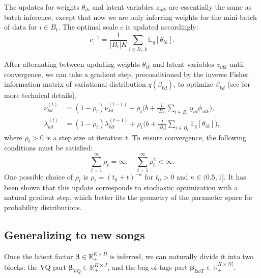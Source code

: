 The updates for weights $\theta_{ik}$ and latent variables $z_{idk}$ are essentially the same as batch inference, except that now we are only inferring weights for the mini-batch of data
for $i \in B_t$. The optimal scale $c$ is updated accordingly:
\begin{equation}
c^{-1} = \frac{1}{|B_t| K}\sum_{i \in B_t, k} \mathbb{E}_q [\theta_{ik}].
\end{equation}

After alternating between updating weights $\theta_{ik}$ and latent variables $z_{idk}$ until convergence, we can take a gradient step,  preconditioned by the inverse Fisher information matrix of variational distribution $q(\beta_{kd})$, to optimize $\beta_{kd}$ (see \cite{hoffman2013stochastic} for more technical details), 
\begin{equation}
\begin{split}
\nu_{kd}^{(t)} &= (1 - \rho_t) \nu_{kd}^{(t-1)} + \rho_t \biggl(b +  \frac{I}{|B_t|}\sum_{i \in B_t} y_{id} \phi_{idk}\biggl),\\
\lambda_{kd}^{(t)} &= (1 - \rho_t) \lambda_{kd}^{(t-1)} + \rho_t \biggl( b +  \frac{I}{|B_t|}\sum_{i \in B_t} \mathbb{E}_q[\theta_{ik}]\biggl),
\end{split}
\end{equation}
where $\rho_t > 0$ is a step size at iteration $t$. To ensure convergence\cite{bottou1998online}, the following conditions must be satisfied:
\begin{equation}
\textstyle\sum_{t=1}^\infty\rho_t = \infty,\quad \sum_{t=1}^\infty \rho_t^2 < \infty.
\end{equation}
One possible choice of $\rho_t$ is $\rho_t = (t_0 + t)^{-\kappa}$ for $t_0 > 0$ and $\kappa \in (0.5, 1]$. It has been shown \cite{hoffman2013stochastic} that this update corresponds to stochastic optimization with a natural gradient step, which better fits the geometry of the parameter space for probability distributions.

\subsection{Generalizing to new songs}
Once the latent factor $\boldsymbol{\beta} \in \mathbb{R}_+^{K \times D}$ is inferred, we can naturally divide it into two blocks: the VQ part $\boldsymbol{\beta}_{\text{VQ}} \in \mathbb{R}_+^{K \times J}$, and the bag-of-tags part $\boldsymbol{\beta}_{\text{BoT}} \in \mathbb{R}_+^{K \times |V|}$. 

